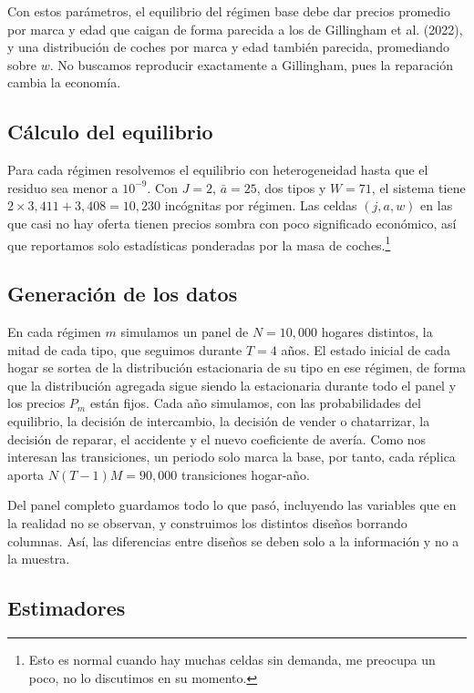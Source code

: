 \documentclass{article}
\begin{document}
Con estos parámetros, el equilibrio del régimen base debe dar precios promedio por marca y edad que caigan de forma parecida a los de Gillingham et al. (2022), y una distribución de coches por marca y edad también parecida, promediando sobre $w$. No buscamos reproducir exactamente a Gillingham, pues la reparación cambia la economía.


\subsection{Cálculo del equilibrio}

Para cada régimen resolvemos el equilibrio con heterogeneidad hasta que el residuo sea menor a $10^{-9}$. Con $J=2$, $\bar{a}=25$, dos tipos y $W=71$, el sistema tiene $2\times3{,}411+3{,}408=10{,}230$ incógnitas por régimen. Las celdas $(j,a,w)$ en las que casi no hay oferta tienen precios sombra con poco significado económico, así que reportamos solo estadísticas ponderadas por la masa de coches.\footnote{Esto es normal cuando hay muchas celdas sin demanda, me preocupa un poco, no lo discutimos en su momento.}

\subsection{Generación de los datos}

En cada régimen $m$ simulamos un panel de $N=10{,}000$ hogares distintos, la mitad de cada tipo, que seguimos durante $T=4$ años. El estado inicial de cada hogar se sortea de la distribución estacionaria de su tipo en ese régimen, de forma que la distribución agregada sigue siendo la estacionaria durante todo el panel y los precios $P_m$ están fijos. Cada año simulamos, con las probabilidades del equilibrio, la decisión de intercambio, la decisión de vender o chatarrizar, la decisión de reparar, el accidente y el nuevo coeficiente de avería. Como nos interesan las transiciones, un periodo solo marca la base, por tanto, cada réplica aporta $N(T-1)M=90{,}000$ transiciones hogar-año.

Del panel completo guardamos todo lo que pasó, incluyendo las variables que en la realidad no se observan, y construimos los distintos diseños borrando columnas. Así, las diferencias entre diseños se deben solo a la información y no a la muestra.

\subsection{Estimadores}
\end{document}
